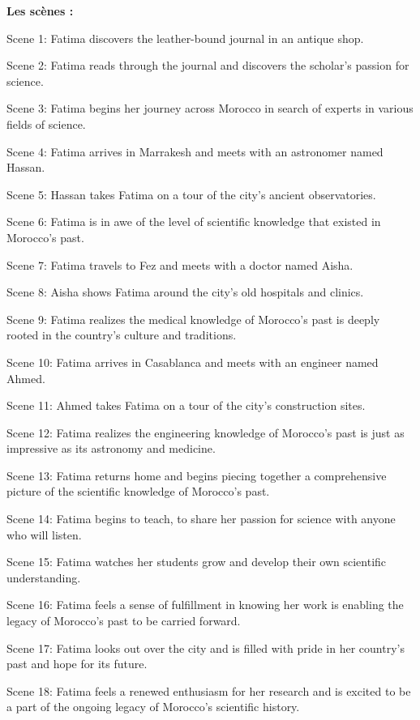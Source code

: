 \documentclass[11,5pt]{report}
\begin{document}
\begin{spacing}{2}
\textbf{Les scènes :}\newline

Scene 1: Fatima discovers the leather-bound journal in an antique shop.

Scene 2: Fatima reads through the journal and discovers the scholar's passion for science.

Scene 3: Fatima begins her journey across Morocco in search of experts in various fields of science.

Scene 4: Fatima arrives in Marrakesh and meets with an astronomer named Hassan.

Scene 5: Hassan takes Fatima on a tour of the city's ancient observatories.

Scene 6: Fatima is in awe of the level of scientific knowledge that existed in Morocco's past.

Scene 7: Fatima travels to Fez and meets with a doctor named Aisha.

Scene 8: Aisha shows Fatima around the city's old hospitals and clinics.

Scene 9: Fatima realizes the medical knowledge of Morocco's past is deeply rooted in the country's culture and traditions.

Scene 10: Fatima arrives in Casablanca and meets with an engineer named Ahmed.

Scene 11: Ahmed takes Fatima on a tour of the city's construction sites.

Scene 12: Fatima realizes the engineering knowledge of Morocco's past is just as impressive as its astronomy and medicine.

Scene 13: Fatima returns home and begins piecing together a comprehensive picture of the scientific knowledge of Morocco's past.

Scene 14: Fatima begins to teach, to share her passion for science with anyone who will listen.

Scene 15: Fatima watches her students grow and develop their own scientific understanding.

Scene 16: Fatima feels a sense of fulfillment in knowing her work is enabling the legacy of Morocco's past to be carried forward.

Scene 17: Fatima looks out over the city and is filled with pride in her country's past and hope for its future.

Scene 18: Fatima feels a renewed enthusiasm for her research and is excited to be a part of the ongoing legacy of Morocco's scientific history.


\end{spacing}
\end{document}
